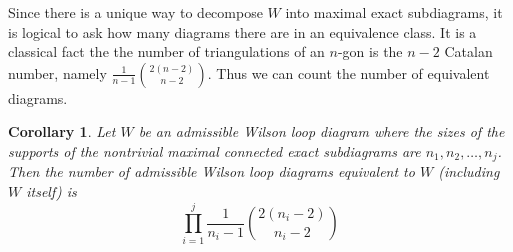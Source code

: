 \documentclass[11pt]{article}
\newtheorem{thm}{Theorem}[section]
\newtheorem{cor}[thm]{Corollary}
\theoremstyle{remark}
\theoremstyle{definition}
\newtheorem{dfn}[thm]{Definition}
\begin{document}
Since there is a unique way to decompose $W$ into maximal exact subdiagrams, it is logical to ask how many diagrams there are in an equivalence class. It is a classical fact the the number of triangulations of an $n$-gon is the $n-2$ Catalan number, namely $\frac{1}{n-1}\binom{2(n-2)}{n-2}$.  Thus we can count the number of equivalent diagrams.

\begin{cor}\label{number of equiv diagrams}
  Let $W$ be an admissible Wilson loop diagram where the sizes of the supports of the nontrivial maximal connected exact subdiagrams are $n_1, n_2, \ldots, n_j$.  Then the number of admissible Wilson loop diagrams equivalent to $W$ (including $W$ itself) is
  \[
  \prod_{i=1}^{j} \frac{1}{n_i-1}\binom{2(n_i-2)}{n_i-2}
  \]
\end{cor}

\end{document}
